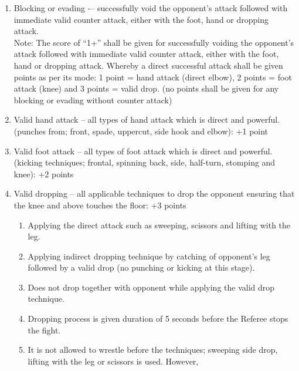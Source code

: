 \begin{legal}
\begin{legal}
\begin{legal}
                \begin{enumerate}[label=\Alph*.]
                \item Blocking or evading -– successfully void the opponent’s attack followed
                      with immediate valid counter attack, either with the foot, hand or
                      dropping attack. \\
                Note: The score of ``1+'' shall be given for successfully voiding the
                      opponent’s attack followed with immediate valid counter attack, either
                      with the foot, hand or dropping attack. Whereby a direct successful
                      attack shall be given points as per its mode: 1 point = hand attack (direct elbow), 
                      2 points = foot attack (knee) and 3 points = valid drop. (no points shall be given
                      for any blocking or evading without counter attack)
                \item Valid hand attack – all types of hand attack which is direct and powerful.
                      (punches from; front, spade, uppercut, side hook and elbow): +1 point
                \item Valid foot attack – all types of foot attack which is direct and powerful.
                      (kicking techniques; frontal, spinning back, side, half-turn, stomping and knee): +2 points
                \item Valid dropping – all applicable techniques to drop the opponent
                      ensuring that the knee and above touches the floor: +3 points
                    \begin{enumerate}[label*=\arabic*.]
                    \item Applying the direct attack such as sweeping, scissors and lifting with the leg.
                    \item Applying indirect dropping technique by catching of opponent’s
                        leg followed by a valid drop (no punching or kicking at this stage).
                    \item Does not drop together with opponent while applying the valid drop technique.
                    \item Dropping process is given duration of 5 seconds before the Referee stops the fight.
                    \item It is not allowed to wrestle before the techniques; sweeping
                        side drop, lifting with the leg or scissors is used. However,

\end{enumerate}
\end{enumerate}
\end{legal}
\end{legal}
\end{legal}
